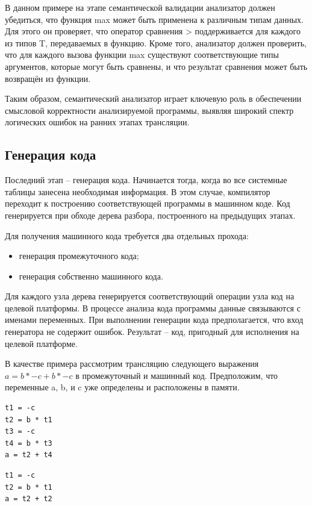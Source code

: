 В данном примере на этапе семантической валидации анализатор должен убедиться, что функция max может быть применена к различным типам данных. Для этого он проверяет, что оператор сравнения > поддерживается для каждого из типов T, передаваемых в функцию. Кроме того, анализатор должен проверить, что для каждого вызова функции max существуют соответствующие типы аргументов, которые могут быть сравнены, и что результат сравнения может быть возвращён из функции.

Таким образом, семантический анализатор играет ключевую роль в обеспечении смысловой корректности анализируемой программы, выявляя широкий спектр логических ошибок на ранних этапах трансляции.

\subsection{Генерация кода}
Последний этап – генерация кода. Начинается тогда, когда во все системные таблицы занесена необходимая информация. В этом случае, компилятор переходит к построению соответствующей программы в машинном коде. Код генерируется при обходе дерева разбора, построенного на предыдущих этапах.

Для получения машинного кода требуется два отдельных прохода:
\begin{itemize}[label = ---]
    \item генерация промежуточного кода;
    \item генерация собственно машинного кода.
\end{itemize}

Для каждого узла дерева генерируется соответствующий операции узла код на целевой платформы. В процессе анализа кода программы данные связываются с именами переменных. При выполнении генерации кода предполагается, что вход генератора не содержит ошибок. Результат – код, пригодный для исполнения на целевой платформе.

В качестве примера рассмотрим трансляцию следующего выражения \\$a = b * -c + b * -c$ в промежуточный и машинный код. Предположим, что переменные a, b, и c уже определены и расположены в памяти.

\begin{lstlisting}[label = 4, caption =  Шаг 1. Генерация промежуточного кода. Выражение преобразуется
в последовательность трехадресных инструкций]
t1 = -c
t2 = b * t1
t3 = -c
t4 = b * t3
a = t2 + t4
\end{lstlisting}
\clearpage
\begin{lstlisting}[label = 5, caption = Шаг 2. Оптимизация промежуточного кода. Устраняем повторяющиеся вычисления]
t1 = -c
t2 = b * t1
a = t2 + t2
\end{lstlisting}

